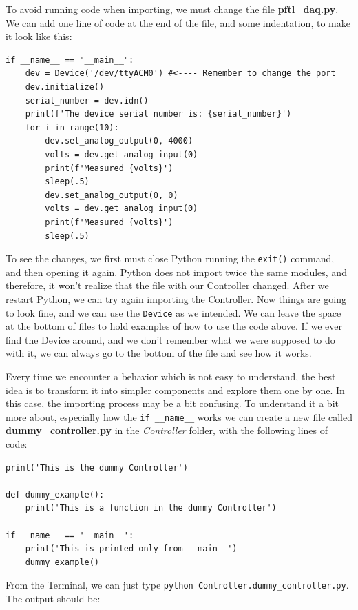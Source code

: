 To avoid running code when importing, we must change the file \textbf{pftl\_daq.py}. We can add one line of code at the end of the file, and some indentation, to make it look like this:

\begin{verbatim}
if __name__ == "__main__":
    dev = Device('/dev/ttyACM0') #<---- Remember to change the port
    dev.initialize()
    serial_number = dev.idn()
    print(f'The device serial number is: {serial_number}')
    for i in range(10):
        dev.set_analog_output(0, 4000)
        volts = dev.get_analog_input(0)
        print(f'Measured {volts}')
        sleep(.5)
        dev.set_analog_output(0, 0)
        volts = dev.get_analog_input(0)
        print(f'Measured {volts}')
        sleep(.5)
\end{verbatim}

To see the changes, we first must close Python running the \texttt{exit()} command, and then opening it again. Python does not import twice the same modules, and therefore, it won't realize that the file with our Controller changed. After we restart Python, we can try again importing the Controller. Now things are going to look fine, and we can use the \texttt{Device} as we intended. We can leave the space at the bottom of files to hold examples of how to use the code above. If we ever find the Device around, and we don't remember what we were supposed to do with it, we can always go to the bottom of the file and see how it works.

Every time we encounter a behavior which is not easy to understand, the best idea is to transform it into simpler components and explore them one by one. In this case, the importing process may be a bit confusing. To understand it a bit more about, especially how the \texttt{if __name__} works we can create a new file called \textbf{dummy\_controller.py} in the \emph{Controller} folder, with the following lines of code:

\begin{verbatim}
print('This is the dummy Controller')

def dummy_example():
    print('This is a function in the dummy Controller')

if __name__ == '__main__':
    print('This is printed only from __main__')
    dummy_example()

\end{verbatim}

From the Terminal, we can just type \texttt{python Controller.dummy\_controller.py}. The output should be:


